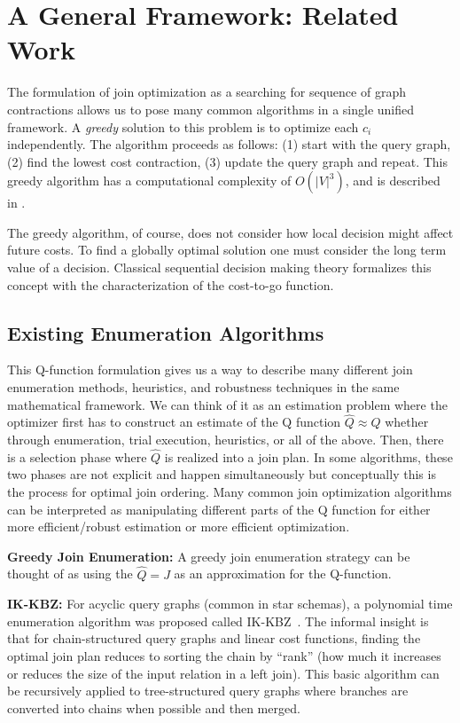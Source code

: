 \section{A General Framework: Related Work}
The formulation of join optimization as a searching for sequence of graph contractions allows us to pose many common algorithms in a single unified framework. A \emph{greedy} solution to this problem is to optimize each $c_i$ independently. The algorithm proceeds as follows: (1) start with the query graph, (2) find the lowest cost contraction, (3) update the query graph and repeat. This greedy algorithm has a computational complexity of $O(|V|^3)$, and is described in \cite{d}.

The greedy algorithm, of course, does not consider how local decision might affect future costs. To find a globally optimal solution one must consider the long term value of a decision. Classical sequential decision making theory formalizes this concept with the characterization of the cost-to-go function.



\subsection{Existing Enumeration Algorithms}
This Q-function formulation gives us a way to describe many different join enumeration methods, heuristics, and robustness techniques in the same mathematical framework. We can think of it as an estimation problem where the optimizer first has to construct an estimate of the Q function $\hat{Q} \approx Q$ whether through enumeration, trial execution, heuristics, or all of the above. Then, there is a selection phase where $\hat{Q}$ is realized into a join plan. In some algorithms, these two phases are not explicit and happen simultaneously but conceptually this is the process for optimal join ordering. Many common join optimization algorithms can be interpreted as manipulating different parts of the Q function for either more efficient/robust estimation or more efficient optimization.

\vspace{0.25em} \noindent \textbf{Greedy Join Enumeration: } A greedy join enumeration strategy can be thought of as using the $\hat{Q} = J$ as an approximation for the Q-function.

\vspace{0.25em} \noindent \textbf{IK-KBZ: } For acyclic query graphs (common in star schemas), a polynomial time enumeration algorithm was proposed called IK-KBZ~\cite{?}. The informal insight is that for chain-structured query graphs and linear cost functions, finding the optimal join plan reduces to sorting the chain by ``rank'' (how much it increases or reduces the size of the input relation in a left join). This basic algorithm can be recursively applied to tree-structured query graphs where branches are converted into chains when possible and then merged. 

